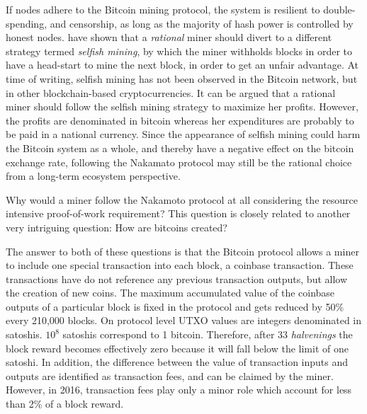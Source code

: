 If nodes adhere to the Bitcoin mining protocol, the system is resilient to double-spending, and censorship, as long as the majority of hash power is controlled by honest nodes. \cite{Eyal2014} have shown that a \emph{rational} miner should divert to a different strategy termed \emph{selfish mining}, by which the miner withholds blocks in order to have a head-start to mine the next block, in order to get an unfair advantage. At time of writing, selfish mining has not been observed in the Bitcoin network, but in other blockchain-based cryptocurrencies. It can be argued that a rational miner should follow the selfish mining strategy to maximize her profits. However, the profits are denominated in bitcoin whereas her expenditures are probably to be paid in a national currency. Since the appearance of selfish mining could harm the Bitcoin system as a whole, and thereby have a negative effect on the bitcoin exchange rate, following the Nakamato protocol may still be the rational choice from a long-term ecosystem perspective. 


Why would a miner follow the Nakamoto protocol at all considering the resource intensive proof-of-work requirement? This question is closely related to another very intriguing question: How are bitcoins created?

The answer to both of these questions is that the Bitcoin protocol allows a miner to include one special transaction into each block, a coinbase transaction. These transactions have do not reference any previous transaction outputs, but allow the creation of new coins. The maximum accumulated value of the coinbase outputs of a particular block is fixed in the protocol and gets reduced by 50\% every 210,000 blocks. On protocol level \ac{UTXO} values are integers denominated in satoshis. $10^8$ satoshis correspond to 1 bitcoin. Therefore, after 33 \emph{halvenings} the block reward becomes effectively zero because it will fall below the limit of one satoshi. In addition, the difference between the value of transaction inputs and outputs are identified as transaction fees, and can be claimed by the miner. However, in 2016, transaction fees play only a minor role which account for less than 2\% of a block reward.

